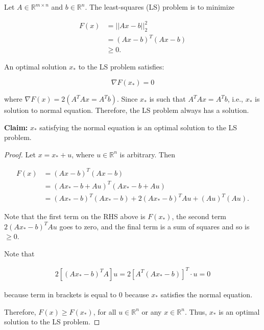 \documentclass[12pt]{article}
\theoremstyle{definition}
\begin{document}
Let $A \in \mathbb{R}^{m \times n}$ and $b \in \mathbb{R}^n$. The least-squares (LS)
problem is to minimize 

\begin{align*}
F(x) &= || Ax - b ||_{2}^{2} \\
&= (Ax - b)^T (Ax - b) \\
&\geq 0.
\end{align*}

An optimal solution $x_*$ to the LS problem satisfies:

\[ \nabla F(x_*) = 0 \]

where $\nabla F(x) = 2(A^T A x = A^T b)$. Since $x_*$ is such that
$A^T A x = A^T b$, i.e., $x_*$ is solution to normal equation. Therefore,
the LS problem always has a solution.

\vspace{0.2cm}

\noindent \textbf{Claim:} $x_*$ satisfying the normal equation is an optimal solution to the
LS problem.

\begin{proof}
Let $x = x_* + u$, where $u \in \mathbb{R}^n$ is arbitrary. Then

\begin{align*}
F(x) &= (Ax - b)^T (Ax - b) \\
&= (Ax_* - b + Au)^T (Ax_* - b + Au) \\
&= (Ax_* - b)^T (Ax_* - b) + 2(Ax_* - b)^T Au + (Au)^T(Au).
\end{align*}

\noindent Note that the first term on the RHS above is $F(x_*)$, the second term $2(Ax_* - b)^T Au$ 
goes to zero, and the final term is a sum of squares and so is $\geq 0$.

\vspace{0.2cm}

Note that

\begin{align*}
2[(Ax_* - b)^T A]u = 2[A^T (Ax_* - b)]^T \cdot u = 0
\end{align*}

because term in brackets is equal to $0$ because $x_*$ satisfies the normal equation.

\vspace{0.2cm}

\noindent Therefore, $F(x) \geq F(x_*)$, for all $u \in \mathbb{R}^n$ or any $x \in \mathbb{R}^n$.
Thus, $x_*$ is an optimal solution to the LS problem.
\end{proof}
\end{document}
